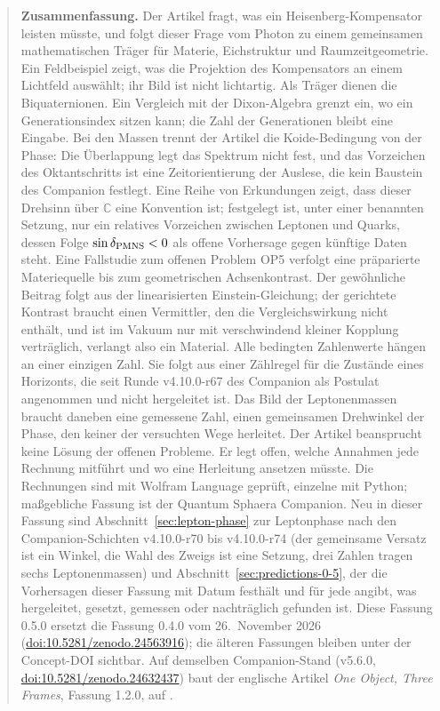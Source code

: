 \documentclass[11pt,a4paper]{article}
\begin{document}
\begin{quote}
\small
\noindent\textbf{Zusammenfassung.}
Der Artikel fragt, was ein Heisenberg-Kompensator leisten müsste, und folgt dieser Frage vom Photon zu einem gemeinsamen
mathematischen Träger für Materie, Eichstruktur und Raumzeitgeometrie. Ein Feldbeispiel zeigt, was die Projektion des
Kompensators an einem Lichtfeld auswählt; ihr Bild ist nicht lichtartig. Als Träger dienen die Biquaternionen. Ein Vergleich mit
der Dixon-Algebra grenzt ein, wo ein Generationsindex sitzen kann; die Zahl der Generationen bleibt eine Eingabe. Bei den Massen
trennt der Artikel die Koide-Bedingung von der Phase: Die Überlappung legt das Spektrum nicht fest, und das Vorzeichen des
Oktantschritts ist eine Zeitorientierung der Auslese, die kein Baustein des Companion festlegt. Eine Reihe von Erkundungen zeigt,
dass dieser Drehsinn über \(\mathbb C\) eine Konvention ist; festgelegt ist, unter einer benannten Setzung, nur ein relatives
Vorzeichen zwischen Leptonen und Quarks, dessen Folge \(\sin\delta_{\rm PMNS}<0\) als offene Vorhersage gegen künftige Daten steht. Eine Fallstudie zum offenen
Problem OP5 verfolgt eine präparierte Materiequelle bis zum geometrischen Achsenkontrast. Der gewöhnliche Beitrag folgt aus der
linearisierten Einstein-Gleichung; der gerichtete Kontrast braucht einen Vermittler, den die Vergleichswirkung nicht enthält,
und ist im Vakuum nur mit verschwindend kleiner Kopplung verträglich, verlangt also ein Material. Alle bedingten Zahlenwerte
hängen an einer einzigen Zahl. Sie folgt aus einer Zählregel für die Zustände eines Horizonts, die seit Runde v4.10.0-r67 des
Companion als Postulat angenommen und nicht hergeleitet ist. Das Bild der Leptonenmassen braucht daneben eine gemessene Zahl,
einen gemeinsamen Drehwinkel der Phase, den keiner der versuchten Wege herleitet. Der Artikel beansprucht keine Lösung
der offenen Probleme. Er legt offen, welche Annahmen jede Rechnung mitführt und wo eine Herleitung ansetzen müsste. Die
Rechnungen sind mit Wolfram Language geprüft, einzelne mit Python; maßgebliche Fassung ist der Quantum Sphaera Companion. Neu in
dieser Fassung sind Abschnitt~\ref{sec:lepton-phase} zur Leptonphase nach den Companion-Schichten v4.10.0-r70 bis v4.10.0-r74 (der
gemeinsame Versatz ist ein Winkel, die Wahl des Zweigs ist eine Setzung, drei Zahlen tragen sechs Leptonenmassen) und
Abschnitt~\ref{sec:predictions-0-5}, der die Vorhersagen dieser Fassung mit Datum festhält und für jede angibt, was hergeleitet,
gesetzt, gemessen oder nachträglich gefunden ist. Diese Fassung 0.5.0 ersetzt die Fassung 0.4.0 vom 26.~November 2026
(\href{https://doi.org/10.5281/zenodo.24563916}{doi:10.5281/zenodo.24563916}); die älteren Fassungen bleiben unter der Concept-DOI sichtbar. Auf demselben Companion-Stand
(v5.6.0, \href{https://doi.org/10.5281/zenodo.24632437}{doi:10.5281/zenodo.24632437}) baut der englische Artikel \emph{One Object, Three Frames},
Fassung 1.2.0, auf \cite{oneobject}.
\end{quote}
\end{document}
